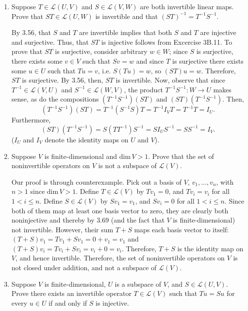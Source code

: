 \documentclass{book}
\begin{document}
\begin{enumerate}

\item Suppose \(T \in \mathcal{L}(U,V)\) and \(S \in \mathcal{L}(V,W)\) are both invertible linear maps.  Prove that \(ST \in \mathcal{L}(U,W)\) is invertible and that \((ST)^{-1}=T^{-1}S^{-1}\).

By 3.56, that \(S\) and \(T\) are invertible implies that both \(S\) and \(T\) are injective and surjective.  Thus, that \(ST\) is injective follows from Excercise 3B.11.  To prove that \(ST\) is surjective, consider arbitrary \(w \in W\); since \(S\) is surjective, there exists some \(v \in V\) such that \(Sv=w\) and since \(T\) is surjective there exists some \(u \in U\) such that \(Tu=v\), i.e. \(S(Tu)=w\), so \((ST)u=w\).  Therefore, \(ST\) is surjective.  By 3.56, then, \(ST\) is invertible.  Now, observe that since \(T^{-1} \in \mathcal{L}(V,U)\) and \(S^{-1} \in \mathcal{L}(W,V)\), the product \(T^{-1}S^{-1}:W \rightarrow U\) makes sense, as do the compositions \((T^{-1}S^{-1})(ST)\) and \((ST)(T^{-1}S^{-1})\).  Then, \[(T^{-1}S^{-1})(ST)=T^{-1}(S^{-1}S)T=T^{-1}I_VT=T^{-1}T=I_U.\] Furthermore, \[(ST)(T^{-1}S^{-1})=S(TT^{-1})S^{-1}=SI_US^{-1}=SS^{-1}=I_V.\] (\(I_U\) and \(I_V\) denote the identity maps on \(U\) and \(V\)).

\item Suppose \(V\) is finite-dimensional and \(\textrm{dim} \, V > 1\).  Prove that the set of noninvertible operators on \(V\) is not a subspace of \(\mathcal{L}(V)\).

Our proof is through counterexample.  Pick out a basis of \(V\), \(v_1,\dots,v_n\), with \(n>1\) since \(\textrm{dim} \, V > 1\).  Define \(T \in \mathcal{L}(V)\) by \(Tv_1=0\), and \(Tv_i=v_i\) for all \(1 < i \leq n\).  Define \(S \in \mathcal{L}(V)\) by \(Sv_1=v_1\), and \(Sv_i=0\) for all \(1 < i \leq n\).  Since both of them map at least one basis vector to zero, they are clearly both noninjective and thereby by 3.69 (and the fact that \(V\) is finite-dimensional) not invertible.  However, their sum \(T+S\) maps each basis vector to itself: \((T+S)v_1=Tv_1+Sv_1=0+v_1=v_1\) and \((T+S)v_i=Tv_i+Sv_i=v_i+0=v_i\).  Therefore, \(T+S\) is the identity map on \(V\), and hence invertible.  Therefore, the set of noninvertible operators on \(V\) is not closed under addition, and not a subspace of \(\mathcal{L}(V)\).

\item Suppose \(V\) is finite-dimensional, \(U\) is a subspace of \(V\), and \(S \in \mathcal{L}(U,V)\).  Prove there exists an invertible operator \(T \in \mathcal{L}(V)\) such that \(Tu=Su\) for every \(u \in U\) if and only if \(S\) is injective.


\end{enumerate}
\end{document}
